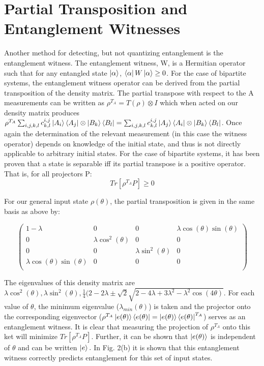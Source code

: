 \documentclass[11pt]{article}
\begin{document}
\section{Partial Transposition and Entanglement Witnesses}
Another method for detecting, but not quantizing entanglement is the entanglement witness.  The entanglement 
witness, W, is a Hermitian operator such that for any entangled state 
\(\ket{\alpha}\), \(\bra{\alpha}W\ket{\alpha} \geq 0\).  For the case of bipartite systems, the
entanglement witness operator can be derived from the partial transposition of the density matrix.  
The partial transpose with respect to the A measurements can be written as 
\( \rho^{T_A} = T(\rho) \otimes I \) which when acted on our density matrix produces
\( \rho^{T_A} \sum_{i,j,k,l} c_{k,l}^{i,j} \ket{A_i}\bra{A_j} \otimes \ket{B_k}\bra{B_l} =
\sum_{i,j,k,l} c_{k,l}^{i,j} \ket{A_j}\bra{A_i} \otimes \ket{B_k}\bra{B_l} \).  
Once again the determination of the relevant measurement (in this case the witness operator) depends 
on knowledge of the initial state, and thus is not directly applicable to arbitrary initial states. 
For the case of bipartite systems, it has been proven that a state is separable iff its partial transpose is a
positive operator\cite{horodecki96}. That is, for all projectors P: \[ Tr[\rho^{T_A} P] \geq 0 \]

For our general input state \(\rho(\theta)\), the partial transposition is given in the same basis as above
by:

\[ \left( \begin{array}{cccc}
1 - \lambda							& 0				& 0				& \lambda\cos (\theta) \sin (\theta)	\\
0									& \lambda\cos ^2 (\theta)		& 0										& 0 \\
0									& 0								& \lambda\sin ^2 (\theta)				& 0 \\ 
\lambda\cos (\theta) \sin (\theta)	& 0								& 0										& 0 \\
\end{array} \right) \]

The eigenvalues of this density matrix are \(\lambda \cos^2 (\theta), \lambda \sin^2 (\theta),
\frac{1}{4} (2 - 2\lambda \pm \sqrt{2} \sqrt{2 - 4\lambda + 3\lambda^2 - \lambda^2 \cos (4\theta)}.\)  For each 
value of \(\theta\), the minimum eigenvalue (\(\lambda_{min} (\theta)\)) is taken and the projector onto the 
corresponding eigenvector (\(\rho^{T_A}\ket{e(\theta)}\bra{e(\theta)} = \ket{e(\theta)}\bra{e(\theta)}^{T_A} \)) 
serves as an entanglement witness.  It is clear that measuring
the projection of \(\rho^{T_A}\) onto this ket will minimize \( Tr[\rho^{T_A} P] \).  Further, it can be shown
that \(\ket{e(\theta)}\) is independent of \(\theta\) and can be written \(\ket{e}.\)  
In Fig. 2(b) \cite{altepeter05} it is shown that this entanglement witness correctly predicts entanglement
for this set of input states.
\end{document}

